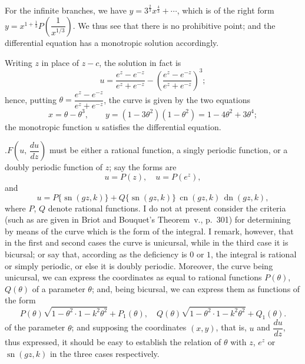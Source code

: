 \documentclass[11pt]{article}
\begin{document}
\begin{center}
\end{center}

For the infinite branches, we have $y = 3^{\frac{2}{3}}x^{\frac{4}{3}} + \cdots$, which is of the right form $y = x^{1+\frac{1}{3}}P\!\left(\dfrac{1}{x^{1/3}}\right)$. We thus see that there is no prohibitive point; and the differential equation has a monotropic solution accordingly.

Writing $z$ in place of $z-c$, the solution in fact is
\[
u = \frac{e^{z}-e^{-z}}{e^{z}+e^{-z}} - \left(\frac{e^{z}-e^{-z}}{e^{z}+e^{-z}}\right)^{3};
\]
hence, putting $\theta = \dfrac{e^{z}-e^{-z}}{e^{z}+e^{-z}}$, the curve is given by the two equations
\[
x = \theta-\theta^{3}, \qquad y = (1-3\theta^{2})(1-\theta^{2}) = 1-4\theta^{2}+3\theta^{4};
\]
the monotropic function $u$ satisfies the differential equation.

\medskip

.\quad $F\!\left(u,\,\dfrac{du}{dz}\right)$ must be either a rational function, a singly periodic function, or a doubly periodic function of $z$; say the forms are
\[
u = P(z),\quad u = P(e^{z}),
\]
and
\[
u = P\{\operatorname{sn}(gz,k)\} + Q\{\operatorname{sn}(gz,k)\}\,\operatorname{cn}(gz,k)\,\operatorname{dn}(gz,k),
\]
where $P$, $Q$ denote rational functions. I do not at present consider the criteria (such as are given in Briot and Bouquet's Theorem~v., p.~301) for determining by means of the curve which is the form of the integral. I remark, however, that in the first and second cases the curve is unicursal, while in the third case it is bicursal; or say that, according as the deficiency is $0$ or $1$, the integral is rational or simply periodic, or else it is doubly periodic. Moreover, the curve being unicursal, we can express the coordinates as equal to rational functions $P(\theta)$, $Q(\theta)$ of a parameter $\theta$; and, being bicursal, we can express them as functions of the form
\[
P(\theta)\sqrt{1-\theta^{2}\cdot 1-k^{2}\theta^{2}} + P_{1}(\theta),\quad Q(\theta)\sqrt{1-\theta^{2}\cdot 1-k^{2}\theta^{2}} + Q_{1}(\theta).
\]
of the parameter $\theta$; and supposing the coordinates $(x,y)$, that is, $u$ and $\dfrac{du}{dz}$, thus expressed, it should be easy to establish the relation of $\theta$ with $z$, $e^{z}$ or $\operatorname{sn}(gz,k)$ in the three cases respectively.
\end{document}
